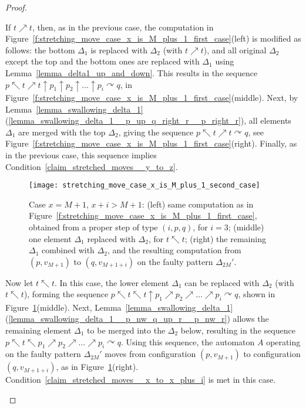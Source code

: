 \documentclass[12pt,a4paper]{article}
\theoremstyle{definition}
\begin{document}
\begin{proof}
\begin{itemize}
	If $t \nearrow t$,
	then, as in the previous case,
	the computation in Figure~\ref{f:stretching_move_case_x_is_M_plus_1_first_case}(left)
	is modified as follows:
	the bottom $\Delta_1$ is replaced with $\Delta_2$ (with $t \nearrow t$),
	and all original $\Delta_2$ except the top and the bottom ones
	are replaced with $\Delta_1$ using Lemma~\ref{lemma_delta1_up_and_down}.
	This results in the sequence
	$p \nwarrow t \nearrow t \uparrow p_1 \uparrow p_2 \uparrow \ldots \uparrow p_i \curvearrowright q$,
	in Figure~\ref{f:stretching_move_case_x_is_M_plus_1_first_case}(middle).
	Next, by Lemma~\ref{lemma_swallowing_delta_1}(\ref{lemma_swallowing_delta_1__p_up_q_right_r__p_right_r}),
	all elements $\Delta_1$ are merged with the top $\Delta_2$,
	giving the sequence $p \nwarrow t \nearrow t \curvearrowright q$,
	see Figure~\ref{f:stretching_move_case_x_is_M_plus_1_first_case}(right).
	Finally, as in the previous case,
	this sequence implies Condition~\ref{claim_stretched_moves__y_to_z}.

\begin{figure}[t]
	\centerline{\texttt{[image: stretching\_move\_case\_x\_is\_M\_plus\_1\_second\_case]}}
	\caption{Case $x = M+1$, $x+i > M+1$:
	(left) same computation as in Figure~\ref{f:stretching_move_case_x_is_M_plus_1_first_case},
	obtained from a proper step of type $(i,p,q)$, for $i=3$;
	(middle) one element $\Delta_1$ replaced with $\Delta_2$, for $t \nwarrow t$;
	(right) the remaining $\Delta_1$ combined with $\Delta_2$,
	and the resulting computation from $(p,v_{M+1})$ to $(q,v_{M+1+i})$ on the faulty pattern $\Delta_{2M}'$.}
	\label{f:stretching_move_case_x_is_M_plus_1_second_case}
\end{figure}

	Now let $t \nwarrow t$.
	In this case, the lower element $\Delta_1$ can be replaced with $\Delta_2$ (with $t \nwarrow t$),
	forming the sequence
	$p \nwarrow t \nwarrow t \uparrow p_1 \nearrow p_2 \nearrow \ldots \nearrow p_i \curvearrowright q$,
	shown in Figure~\ref{f:stretching_move_case_x_is_M_plus_1_second_case}(middle).
	Next, Lemma~\ref{lemma_swallowing_delta_1}(\ref{lemma_swallowing_delta_1__p_nw_q_up_r__p_nw_r})
	allows the remaining element $\Delta_1$ to be merged into the $\Delta_2$ below,
	resulting in the sequence
	$p \nwarrow t \nwarrow p_1 \nearrow p_2 \nearrow \ldots \nearrow p_i \curvearrowright q$.
	Using this sequence, the automaton $A$ operating on the faulty pattern $\Delta_{2M}'$
	moves from configuration $(p,v_{M+1})$ to configuration $(q,v_{M+1+i})$,
	as in Figure~\ref{f:stretching_move_case_x_is_M_plus_1_second_case}(right).
	Condition~\ref{claim_stretched_moves__x_to_x_plus_i} is met in this case.
\end{itemize}
\end{proof}
\end{document}
